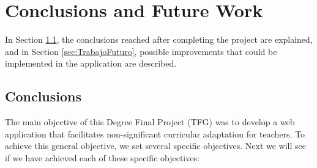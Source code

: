 \chapter{Conclusions and Future Work}
\label{cap:conclusions}


In Section \ref{sec:conclusiones}, the conclusions reached after completing the project are explained, and in Section \ref{sec:TrabajoFuturo}, possible improvements that could be implemented in the application are described.

\section{Conclusions}
\label{sec:conclusiones}
The main objective of this Degree Final Project (TFG) was to develop a web application that facilitates non-significant curricular adaptation for teachers. To achieve this general objective, we set several specific objectives. Next we will see if we have achieved each of these specific objectives:

